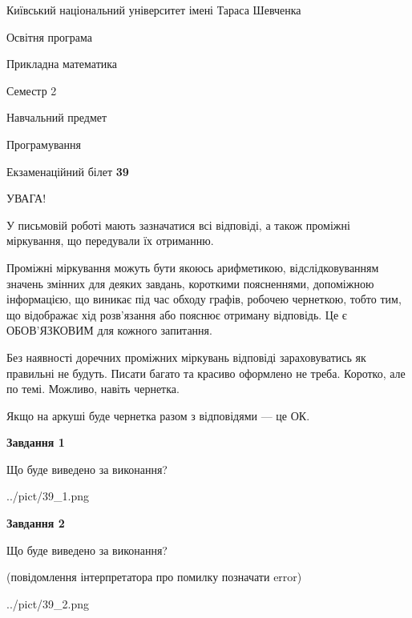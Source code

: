 \documentclass[12pt, ukrainian]{article}
\begin{document}
{{\begin {small}\par
{ \center  Київський національний університет імені Тараса Шевченка \par}
{\parbox {5 cm}{Освітня програма \hfill}{\parbox {7 cm}{Прикладна математика\hfill}}\parbox {6 cm}{\hfill Семестр 2}}\par
{\parbox {5 cm} {Навчальний предмет \hfill}\parbox {7 cm}{Програмування \hfill}\parbox {6cm}{\hfill}\par}\vspace{-7pt} \end{small}}{\center Екзаменаційний білет \No \textbf
{ 39 }\par}}
{
\begin {large}
УВАГА!

У письмовій роботі мають зазначатися всі відповіді, а також проміжні міркування, що передували їх отриманню.

Проміжні міркування можуть бути якоюсь арифметикою, відслідковуванням зна\-чень змінних для деяких завдань,
короткими поясненнями, допоміжною інформацією, що виникає під час обходу графів, робочею чернеткою,
тобто тим, що відображає хід розв’язання або пояснює отриману відповідь.
Це є ОБОВ’ЯЗКОВИМ для кожного запитання.

Без наявності доречних проміжних міркувань відповіді зараховуватись як правиль\-ні не будуть.
Писати багато та красиво оформлено не треба. Коротко, але по темі. Можли\-во, навіть чернетка.

Якщо на аркуші буде чернетка разом з відповідями --- це ОК.

\newpage

{\begin {center}\textbf{Завдання 1}\end {center}}\par
Що буде виведено за виконання?\par
\begin{center}
	{../pict/39_1.png}
\end{center}
\newpage

{\begin {center}\textbf{Завдання 2}\end {center}}\par
Що буде виведено за виконання?\par
 (повідомлення інтерпретатора про помилку позначати error)\par
\begin{center}
	{../pict/39_2.png}
\end{center}
\newpage


\end{large}}
\end{document}
